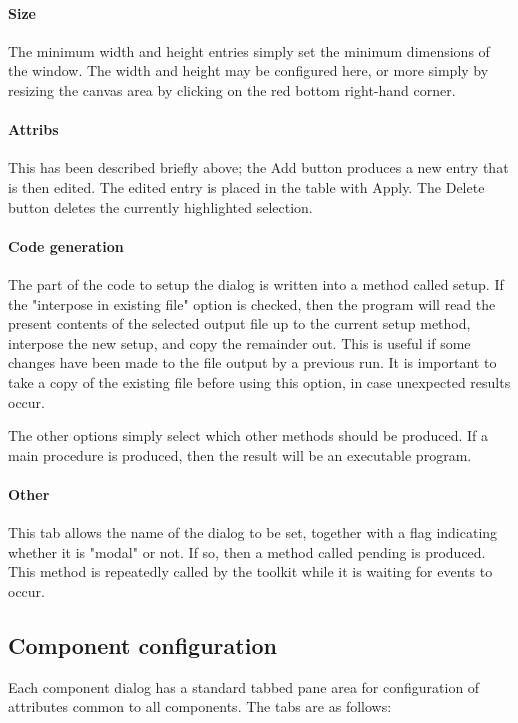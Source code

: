 \paragraph{Size}
The minimum width and height entries simply set the minimum dimensions
of the window. The width and height may be configured here, or more
simply by resizing the canvas area by clicking on the red bottom
right-hand corner.

\paragraph{Attribs}
This has been described briefly above; the Add button produces a new
entry that is then edited. The edited entry is placed in the table with
Apply. The Delete button deletes the currently highlighted selection.

\paragraph{Code generation}
The part of the code to setup the dialog is written into a method called
setup. If the "interpose in existing file"
option is checked, then the program will read the present contents of
the selected output file up to the current setup method, interpose the
new setup, and copy the remainder out. This is useful if some changes
have been made to the file output by a previous run. It is
important to take a copy of the existing file before using this option,
in case unexpected results occur.

The other options simply select which other methods should be produced.
If a main procedure is produced, then the result will be an executable
program.

\paragraph{Other}
This tab allows the name of the dialog to be set, together with a flag
indicating whether it is "modal" or not. If
so, then a method called pending is produced. This method is repeatedly
called by the toolkit while it is waiting for events to occur.


\subsection*{Component configuration}

Each component dialog has a standard tabbed pane area for configuration
of attributes common to all components. The tabs are as follows:

